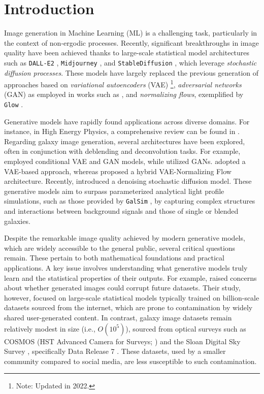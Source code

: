 \documentclass[fleqn,usenatbib]{mnras}
\begin{document}
\section{Introduction}
\label{sec:Intro}
Image generation in Machine Learning (ML) is a challenging task, particularly in the context of non-ergodic processes. Recently, significant breakthroughs in image quality have been achieved thanks to large-scale statistical model architectures such as \texttt{DALL-E2} \citep{ramesh2022}, \texttt{Midjourney} \citep{Oppenlaender2022}, and \texttt{StableDiffusion} \citep{Rombach2022}, which leverage \textit{stochastic diffusion processes}. These models have largely replaced the previous generation of approaches based on \textit{variational autoencoders} (VAE) \citep{Kingma2014}\footnote{Note: Updated in 2022.}, \textit{adversarial networks} (GAN) \citep{goodfellow2014generative} as employed in works such as \citep[e.g.,][]{KarrasALL18,brock2018large}, and \textit{normalizing flows}, exemplified by \texttt{Glow} \citep{Kingma2018}. 

Generative models have rapidly found applications across diverse domains. For instance, in High Energy Physics, a comprehensive review can be found in \cite{PhysRevD.107.076017}. Regarding galaxy image generation, several architectures have been explored, often in conjunction with deblending and deconvolution tasks. For example, \cite{ravanbakhsh2016} employed conditional VAE and GAN models, while \citep{Schawinski2017,Fussell2019,Hemmati_2022} utilized GANs. \cite{Arcelin2020} adopted a VAE-based approach, whereas \cite{Lanusse2021} proposed a hybrid VAE-Normalizing Flow architecture. Recently, \cite{smith2021} introduced a denoising stochastic diffusion model. These generative models aim to surpass parameterized analytical light profile simulations, such as those provided by \texttt{GalSim} \citep{ROWE2015121}, by capturing complex structures and interactions between background signals and those of single or blended galaxies. 

Despite the remarkable image quality achieved by modern generative models, which are widely accessible to the general public, several critical questions remain. These pertain to both mathematical foundations and practical applications. A key issue involves understanding what generative models truly learn and the statistical properties of their outputs. For example, \cite{Hataya2023} raised concerns about whether generated images could corrupt future datasets. Their study, however, focused on large-scale statistical models typically trained on billion-scale datasets sourced from the internet, which are prone to contamination by widely shared user-generated content. In contrast, galaxy image datasets remain relatively modest in size (i.e., $O(10^5)$), sourced from optical surveys such as COSMOS (HST Advanced Camera for Surveys; \cite{mandelbaum_2019_3242143}) and the Sloan Digital Sky Survey \citep[SDSS;][]{sdss}, specifically Data Release 7 \citep{sdssdr7}. These datasets, used by a smaller community compared to social media, are less susceptible to such contamination.
\end{document}
